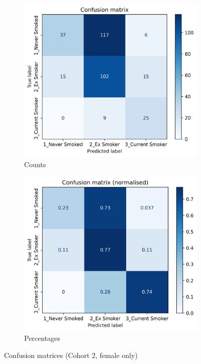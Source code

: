 \documentclass{article} %
\begin{document}
\begin{figure}[p]
    \centering
    \begin{subfigure}{0.45\linewidth}
        \centering
        \includegraphics[width=\linewidth]{cohort2/female_only/test_confusion_matrix.png}
        \caption{Counts}
    \end{subfigure}
    \hspace{4mm}
    \begin{subfigure}{0.45\linewidth}
        \centering
        \includegraphics[width=\linewidth]{cohort2/female_only/test_confusion_matrix_normalised.png}
        \caption{Percentages}
    \end{subfigure}
    \caption[Confusion matrices (Cohort 2, female only)]{Confusion matrices (Cohort 2, female only)}
    \label{fig:female-only-confusion-matrix}
\end{figure}
\end{document}
